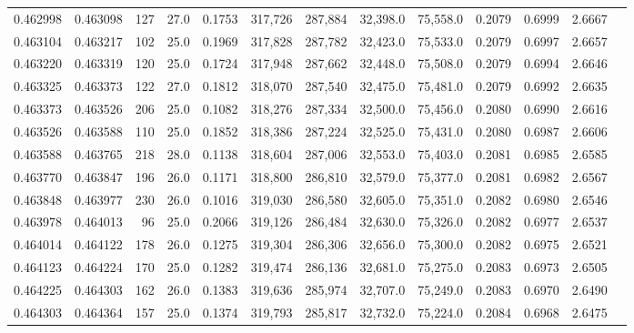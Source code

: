 \begin{tabular}{rrrrrrrrrrrrr}
0.462998 & 0.463098 &   127 & 27.0 &                                     0.1753 & 317,726 & 287,884 &  32,398.0 &  75,558.0 & 0.2079 & 0.6999 & 2.6667 \\
0.463104 & 0.463217 &   102 & 25.0 &                                     0.1969 & 317,828 & 287,782 &  32,423.0 &  75,533.0 & 0.2079 & 0.6997 & 2.6657 \\
0.463220 & 0.463319 &   120 & 25.0 &                                     0.1724 & 317,948 & 287,662 &  32,448.0 &  75,508.0 & 0.2079 & 0.6994 & 2.6646 \\
0.463325 & 0.463373 &   122 & 27.0 &                                     0.1812 & 318,070 & 287,540 &  32,475.0 &  75,481.0 & 0.2079 & 0.6992 & 2.6635 \\
0.463373 & 0.463526 &   206 & 25.0 &                                     0.1082 & 318,276 & 287,334 &  32,500.0 &  75,456.0 & 0.2080 & 0.6990 & 2.6616 \\
0.463526 & 0.463588 &   110 & 25.0 &                                     0.1852 & 318,386 & 287,224 &  32,525.0 &  75,431.0 & 0.2080 & 0.6987 & 2.6606 \\
0.463588 & 0.463765 &   218 & 28.0 &                                     0.1138 & 318,604 & 287,006 &  32,553.0 &  75,403.0 & 0.2081 & 0.6985 & 2.6585 \\
0.463770 & 0.463847 &   196 & 26.0 &                                     0.1171 & 318,800 & 286,810 &  32,579.0 &  75,377.0 & 0.2081 & 0.6982 & 2.6567 \\
0.463848 & 0.463977 &   230 & 26.0 &                                     0.1016 & 319,030 & 286,580 &  32,605.0 &  75,351.0 & 0.2082 & 0.6980 & 2.6546 \\
0.463978 & 0.464013 &    96 & 25.0 &                                     0.2066 & 319,126 & 286,484 &  32,630.0 &  75,326.0 & 0.2082 & 0.6977 & 2.6537 \\
0.464014 & 0.464122 &   178 & 26.0 &                                     0.1275 & 319,304 & 286,306 &  32,656.0 &  75,300.0 & 0.2082 & 0.6975 & 2.6521 \\
0.464123 & 0.464224 &   170 & 25.0 &                                     0.1282 & 319,474 & 286,136 &  32,681.0 &  75,275.0 & 0.2083 & 0.6973 & 2.6505 \\
0.464225 & 0.464303 &   162 & 26.0 &                                     0.1383 & 319,636 & 285,974 &  32,707.0 &  75,249.0 & 0.2083 & 0.6970 & 2.6490 \\
0.464303 & 0.464364 &   157 & 25.0 &                                     0.1374 & 319,793 & 285,817 &  32,732.0 &  75,224.0 & 0.2084 & 0.6968 & 2.6475 \\

\end{tabular}
